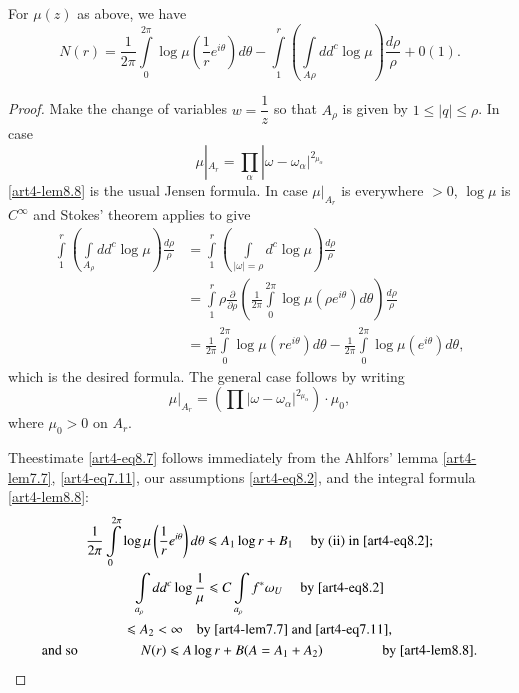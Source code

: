 \begin{lemma}\label{art4-lem8.8}
For $\mu(z)$ as above, we have 
$$
N (r) = \frac{1}{2\pi} \int\limits^{2\pi}_0 \log \mu \left(\frac{1}{r} e^{i\theta} \right) d \theta - \int\limits^r_1 \left(\int\limits_{A\rho} dd^c \log \mu \right) \frac{d\rho}{\rho} + 0 (1).
$$
\end{lemma}

\begin{proof}
Make the change of variables $w = \dfrac{1}{z}$ so that $A_\rho$ is given by $1 \leqslant |q| \leqslant \rho$. In case
$$
\mu |_{A_r} = \prod\limits_\alpha  |\omega- \omega_\alpha|^{2_{\mu_\alpha}}
$$
\eqref{art4-lem8.8} is the usual Jensen formula. In case $\mu|_{A_r}$ is everywhere $>0$,  $\log \mu$ is $C^\infty$ and Stokes' theorem applies to give
\begin{align*}
\int\limits^r_1 \left(\int\limits_{A_\rho} dd^c \log \mu \right) \frac{d\rho}{\rho} & = \int\limits^r_1 \left(\int\limits_{|\omega|=\rho} d^c \log \mu \right) \frac{d\rho}{\rho}\\
& = \int\limits^r_1 \rho \frac{\partial}{\partial \rho} \left(\frac{1}{2\pi} \int\limits^{2\pi}_0 \log \mu (\rho e^{i\theta}) d\theta \right) \frac{d\rho}{\rho}\\
& = \frac{1}{2\pi} \int\limits^{2\pi}_0 \log \mu (re^{i\theta}) d\theta - \frac{1}{2\pi} \int\limits^{2\pi}_{0} \log \mu (e^{i\theta}) d \theta,
\end{align*}
which is the desired formula. The general case follows by writing
$$
\mu|_{A_r} = (\prod |\omega -\omega_\alpha|^{2_{\mu_\alpha}}) \cdot \mu_0,
$$
where $\mu_0 > 0$ on $A_r$.

The\pageoriginale estimate \eqref{art4-eq8.7} follows immediately from the Ahlfors' lemma \eqref{art4-lem7.7}, \eqref{art4-eq7.11}, our assumptions \eqref{art4-eq8.2}, and the integral formula \eqref{art4-lem8.8}:
\begin{gather*}
\frac{1}{2\pi} \int\limits^{2\pi}_0 \log \mu \left(\frac{1}{r}e^{i\theta} \right) d \theta \leqslant A_1 \log r + B_1 \quad \text{ by (ii) in \eqref{art4-eq8.2};}\\
\int\limits_{a_\rho} dd^c \log \frac{1}{\mu} \leqslant C \int\limits_{a_\rho} f^\ast \omega_U \quad \text{ by \eqref{art4-eq8.2}}\\
\leqslant A_2 < \infty \quad \text{by \eqref{art4-lem7.7} and \eqref{art4-eq7.11},}\\
\text{and so } \hspace{1.5cm} N (r) \leqslant A \log r + B (A = A_1 + A_2) \hspace{1.5cm}  \text{by \eqref{art4-lem8.8}.}
\end{gather*}
\end{proof}


